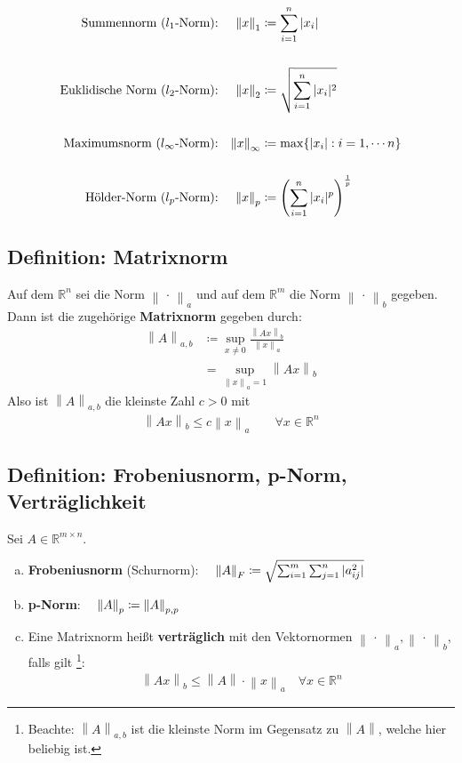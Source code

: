 \documentclass[ngerman,fontsize=11pt, paper=a4, parskip=half, titlepage=true, toc=bib]{scrbook}
\newcommand{\R}{\mathds{R}}
\newcommand{\nn}[1]{\left\| #1 \right\|}
\begin{document}
  \begin{align*}
    \text{Summennorm ($l_1$-Norm):} &&	\nn{x}_1 &\coloneqq \sum_{i=1}^{n}|x_i| 
                                                   \index{Norm!Summennorm}\\
    \\
    \text{Euklidische Norm ($l_2$-Norm):} &&	\nn{x}_2 &\coloneqq \sqrt{\sum_{i=1}^{n}|x_i|^2}
                                                           \index{Norm!Euklidische Norm} \\
    \\
    \text{Maximumsnorm ($l_\infty$-Norm):} &&\nn{x}_\infty &\coloneqq \max\{|x_i| : i=1, \cdots n\} \\
    \index{Norm!Maximumsnorm}
    \\
    \text{Hölder-Norm ($l_p$-Norm):} &&	\nn{x}_p &\coloneqq 
                                                   \left(\sum_{i=1}^{n}|x_i|^p\right)^{\frac{1}{p}} 
                                                   \index{Norm!Hölder-Norm}
  \end{align*}



  \subsection{Definition: Matrixnorm} \label{3.2.4}
  Auf dem $\R^n$  sei die Norm $\nn{\,\cdot\,}_a$ und auf dem $\R^m$ die Norm $\nn{\,\cdot\,}_b$ gegeben.
  Dann ist die zugehörige \textbf{Matrixnorm}  gegeben durch:
  \begin{align}
    \nn{A}_{a,b} &\coloneqq \sup_{x\neq 0} \frac{\nn{Ax}_b}{\nn{x}_a} \\ \nonumber
                 &= \sup_{\nn{x}_a=1} \nn{Ax}_b \label{III.2.1} 
  \end{align}
  Also ist   $\nn{A}_{a,b}$ die kleinste Zahl $c>0$ mit
  \begin{gather*}
    \nn{Ax}_b  \leq c\nn{x}_a \quad\quad \forall x\in \R^n
  \end{gather*}

  \subsection{Definition: Frobeniusnorm, p-Norm, Verträglichkeit} \label{3.2.5}
  Sei $A\in \R^{m\times n}$.
  \begin{enumerate}[a)]
  \item \textbf{Frobeniusnorm} (Schurnorm):
    $ \quad \nn{A}_F \coloneqq \sqrt{\sum_{i=1}^{m}\sum_{j=1}^{n}|a_{ij}^2|}
    \index{Norm!Frobeniusnorm}$
  \item \textbf{p-Norm}: 
    $\quad \nn{A}_p \coloneqq \nn{A}_{p,p}
    \index{p-Norm}$
  \item Eine Matrixnorm heißt \textbf{verträglich}  mit den Vektornormen 
    $\nn{\,\cdot\,}_a, \nn{\,\cdot\,}_b$, falls gilt
    \footnote{ Beachte: $\nn{A}_{a,b}$ ist die kleinste Norm im Gegensatz zu $\nn{A}$, welche hier beliebig ist.}:
    \begin{gather*}
      \nn{Ax}_b \leq \nn{A}\cdot \nn{x}_a \quad \forall x\in \R^n
    \end{gather*}
  \end{enumerate}
\end{document}

